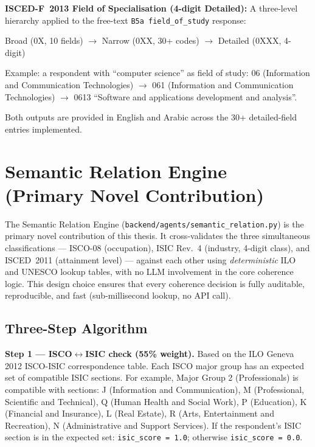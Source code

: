 \textbf{ISCED-F~2013 Field of Specialisation (4-digit Detailed):}
A three-level hierarchy applied to the free-text \texttt{B5a field\_of\_study}
response:
\begin{center}
Broad (0X, 10 fields) $\to$ Narrow (0XX, 30+ codes) $\to$
Detailed (0XXX, 4-digit)
\end{center}

Example: a respondent with ``computer science'' as field of study:
06 (Information and Communication Technologies) $\to$
061 (Information and Communication Technologies) $\to$
0613 ``Software and applications development and analysis''.

Both outputs are provided in English and Arabic across the 30+ detailed-field
entries implemented.

\section{Semantic Relation Engine (Primary Novel Contribution)}
\label{sec:arch-sre}

The Semantic Relation Engine (\texttt{backend/\-agents/\-semantic\_\-relation.\-py})
is the primary novel contribution of this thesis.
It cross-validates the three simultaneous classifications ---
ISCO-08 (occupation), ISIC Rev.~4 (industry, 4-digit class), and ISCED~2011
(attainment level) --- against each other using \textit{deterministic} ILO and
UNESCO lookup tables, with no LLM involvement in the core coherence logic.
This design choice ensures that every coherence decision is fully auditable,
reproducible, and fast (sub-millisecond lookup, no API call).

\subsection{Three-Step Algorithm}

\textbf{Step 1 --- ISCO$\leftrightarrow$ISIC check (55\% weight).}
Based on the ILO Geneva 2012 ISCO-ISIC correspondence table.
Each ISCO major group has an expected set of compatible ISIC sections.
For example, Major Group 2 (Professionals) is compatible with sections:
J (Information and Communication), M (Professional, Scientific and Technical),
Q (Human Health and Social Work), P (Education), K (Financial and Insurance),
L (Real Estate), R (Arts, Entertainment and Recreation), N (Administrative and
Support Services).
If the respondent's ISIC section is in the expected set: \texttt{isic\_score = 1.0};
otherwise \texttt{isic\_score = 0.0}.

